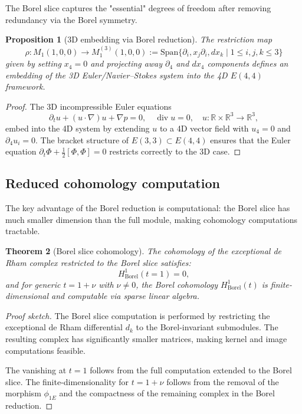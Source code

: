 \documentclass[reqno,10pt]{amsart}
\theoremstyle{plain}
\newtheorem{theorem}{Theorem}[section]
\newtheorem{proposition}[theorem]{Proposition}
\theoremstyle{definition}
\def\gE{E(4,4)}
\def\div{\operatorname{div}}
\begin{document}
The Borel slice captures the "essential" degrees of freedom after removing redundancy via the Borel symmetry.

\begin{proposition}[3D embedding via Borel reduction]
The restriction map
\[
  \rho: M_1(1,0,0) \to M_1^{(3)}(1,0,0) := \text{Span}\{\partial_i, x_j\partial_i, dx_k \mid 1\le i,j,k\le 3\}
\]
given by setting $x_4=0$ and projecting away $\partial_4$ and $dx_4$ components defines an embedding of the 3D Euler/Navier--Stokes system into the 4D $\gE$ framework.
\end{proposition}

\begin{proof}
The 3D incompressible Euler equations
\[
  \partial_t u + (u\cdot\nabla)u + \nabla p = 0, \quad \div u = 0, \quad u:\mathbb{R}\times\mathbb{R}^3\to\mathbb{R}^3,
\]
embed into the 4D system by extending $u$ to a 4D vector field with $u_4=0$ and $\partial_4 u_i = 0$. The bracket structure of $E(3,3)\subset E(4,4)$ ensures that the Euler equation $\partial_t\Phi + \tfrac{1}{2}[\Phi,\Phi]=0$ restricts correctly to the 3D case.
\end{proof}

\subsection{Reduced cohomology computation}

The key advantage of the Borel reduction is computational: the Borel slice has much smaller dimension than the full module, making cohomology computations tractable.

\begin{theorem}[Borel slice cohomology]\label{thm:borel-cohomology}
The cohomology of the exceptional de Rham complex restricted to the Borel slice satisfies:
\[
  H^1_{\text{Borel}}(t=1) = 0,
\]
and for generic $t=1+\nu$ with $\nu\neq 0$, the Borel cohomology $H^1_{\text{Borel}}(t)$ is finite-dimensional and computable via sparse linear algebra.
\end{theorem}

\begin{proof}[Proof sketch]
The Borel slice computation is performed by restricting the exceptional de Rham differential $d_k$ to the Borel-invariant submodules. The resulting complex has significantly smaller matrices, making kernel and image computations feasible.

The vanishing at $t=1$ follows from the full computation extended to the Borel slice. The finite-dimensionality for $t=1+\nu$ follows from the removal of the morphism $\phi_{1E}$ and the compactness of the remaining complex in the Borel reduction.
\end{proof}
\end{document}
